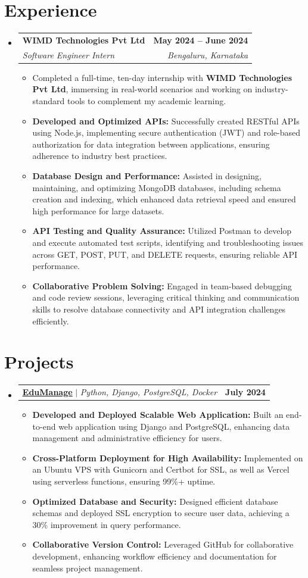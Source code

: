 \documentclass[a4paper,11pt]{article}
\makeatletter
\newcommand{\resumeItem}[1]{
  \item\small{#1 \vspace{-2pt}}
}
\newcommand{\resumeSubheading}[4]{
  \vspace{-2pt}\item
    \begin{tabular*}{0.97\textwidth}[t]{l@{\extracolsep{\fill}}r}
      \textbf{#1} & \textbf{\small #2} \\
      \textit{\small#3} & \textit{\small #4} \\
    \end{tabular*}\vspace{-7pt}
}
\newcommand{\resumeProjectHeading}[2]{
    \item
    \begin{tabular*}{0.97\textwidth}{l@{\extracolsep{\fill}}r}
      \small#1 & \textbf{\small #2} \\
    \end{tabular*}\vspace{-7pt}
}
\newcommand{\resumeSubHeadingListStart}{\begin{itemize}[leftmargin=0.15in, label={}]}
\newcommand{\resumeSubHeadingListEnd}{\end{itemize}}
\newcommand{\resumeItemListStart}{\begin{itemize}}
\newcommand{\resumeItemListEnd}{\end{itemize}\vspace{-5pt}}
\makeatother
\begin{document}
\section{Experience}
\resumeSubHeadingListStart
\resumeSubheading
{WIMD Technologies Pvt Ltd}{May 2024 -- June 2024}
{Software Engineer Intern}{Bengaluru, Karnataka}
\resumeItemListStart
\resumeItem{Completed a full-time, ten-day internship with \textbf{WIMD Technologies Pvt Ltd}, immersing in real-world scenarios and working on industry-standard tools to complement my academic learning.}
\resumeItem{\textbf{Developed and Optimized APIs:} Successfully created RESTful APIs using Node.js, implementing secure authentication (JWT) and role-based authorization for data integration between applications, ensuring adherence to industry best practices.}
\resumeItem{\textbf{Database Design and Performance:} Assisted in designing, maintaining, and optimizing MongoDB databases, including schema creation and indexing, which enhanced data retrieval speed and ensured high performance for large datasets.}
\resumeItem{\textbf{API Testing and Quality Assurance:} Utilized Postman to develop and execute automated test scripts, identifying and troubleshooting issues across GET, POST, PUT, and DELETE requests, ensuring reliable API performance.}
\resumeItem{\textbf{Collaborative Problem Solving:} Engaged in team-based debugging and code review sessions, leveraging critical thinking and communication skills to resolve database connectivity and API integration challenges efficiently.}
\resumeItemListEnd
\resumeSubHeadingListEnd

\section{Projects}
\resumeSubHeadingListStart
\resumeProjectHeading
{\textbf{\href{https://github.com/ajmalbuv/EduManage}{\underline{EduManage}}} $|$ \emph{Python, Django, PostgreSQL, Docker}}{July 2024}
\resumeItemListStart
\resumeItem{\textbf{Developed and Deployed Scalable Web Application:} Built an end-to-end web application using Django and PostgreSQL, enhancing data management and administrative efficiency for users.}
\resumeItem{\textbf{Cross-Platform Deployment for High Availability:} Implemented on an Ubuntu VPS with Gunicorn and Certbot for SSL, as well as Vercel using serverless functions, ensuring 99\%+ uptime.}
\resumeItem{\textbf{Optimized Database and Security:} Designed efficient database schemas and deployed SSL encryption to secure user data, achieving a 30\% improvement in query performance.}
\resumeItem{\textbf{Collaborative Version Control:} Leveraged GitHub for collaborative development, enhancing workflow efficiency and documentation for seamless project management.}
\resumeItemListEnd
\resumeSubHeadingListEnd
\end{document}
